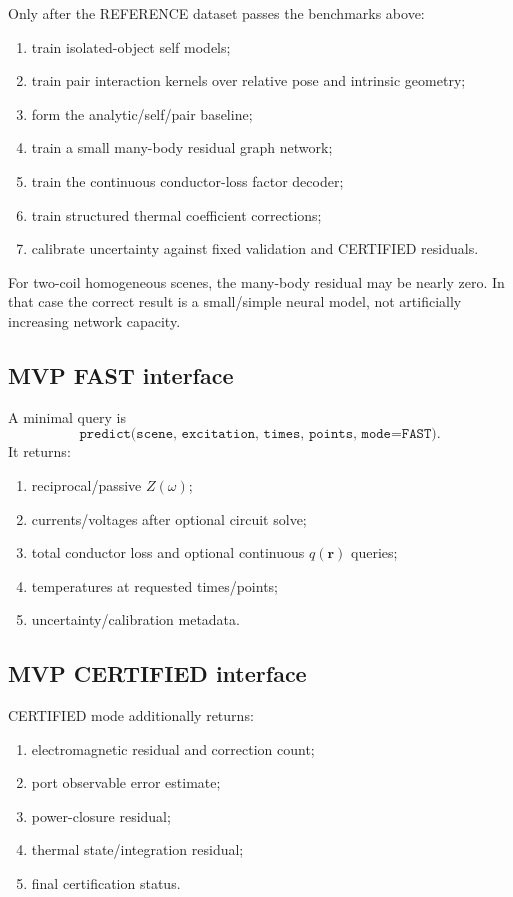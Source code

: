 Only after the REFERENCE dataset passes the benchmarks above:
\begin{enumerate}
\item train isolated-object self models;
\item train pair interaction kernels over relative pose and intrinsic geometry;
\item form the analytic/self/pair baseline;
\item train a small many-body residual graph network;
\item train the continuous conductor-loss factor decoder;
\item train structured thermal coefficient corrections;
\item calibrate uncertainty against fixed validation and CERTIFIED residuals.
\end{enumerate}

For two-coil homogeneous scenes, the many-body residual may be nearly zero. In
that case the correct result is a small/simple neural model, not artificially
increasing network capacity.

\subsection{MVP FAST interface}

A minimal query is
\[
 \texttt{predict(scene, excitation, times, points, mode=FAST)}.
\]
It returns:
\begin{enumerate}
\item reciprocal/passive $Z(\omega)$;
\item currents/voltages after optional circuit solve;
\item total conductor loss and optional continuous $q(\mathbf r)$ queries;
\item temperatures at requested times/points;
\item uncertainty/calibration metadata.
\end{enumerate}

\subsection{MVP CERTIFIED interface}

CERTIFIED mode additionally returns:
\begin{enumerate}
\item electromagnetic residual and correction count;
\item port observable error estimate;
\item power-closure residual;
\item thermal state/integration residual;
\item final certification status.
\end{enumerate}

